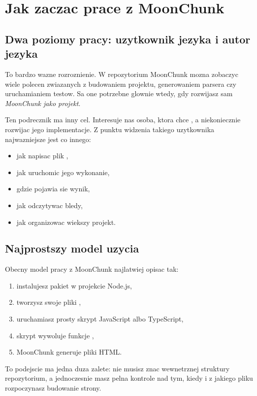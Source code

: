\chapter{Jak zaczac prace z MoonChunk}

\section{Dwa poziomy pracy: uzytkownik jezyka i autor jezyka}
To bardzo wazne rozroznienie. W repozytorium MoonChunk mozna zobaczyc wiele polecen
zwiazanych z budowaniem projektu, generowaniem parsera czy uruchamianiem testow.
Sa one potrzebne glownie wtedy, gdy rozwijasz sam \emph{MoonChunk jako projekt}.

Ten podrecznik ma inny cel. Interesuje nas osoba, ktora chce ,
a niekoniecznie rozwijac jego implementacje. Z punktu widzenia takiego uzytkownika
najwazniejsze jest co innego:

\begin{itemize}
  \item jak napisac plik ,
  \item jak uruchomic jego wykonanie,
  \item gdzie pojawia sie wynik,
  \item jak odczytywac bledy,
  \item jak organizowac wiekszy projekt.
\end{itemize}

\section{Najprostszy model uzycia}
Obecny model pracy z MoonChunk najlatwiej opisac tak:

\begin{enumerate}
  \item instalujesz pakiet  w projekcie Node.js,
  \item tworzysz swoje pliki ,
  \item uruchamiasz prosty skrypt JavaScript albo TypeScript,
  \item skrypt wywoluje funkcje ,
  \item MoonChunk generuje pliki HTML.
\end{enumerate}

To podejscie ma jedna duza zalete: nie musisz znac wewnetrznej struktury repozytorium,
a jednoczesnie masz pelna kontrole nad tym, kiedy i z jakiego pliku rozpoczynasz
budowanie strony.


